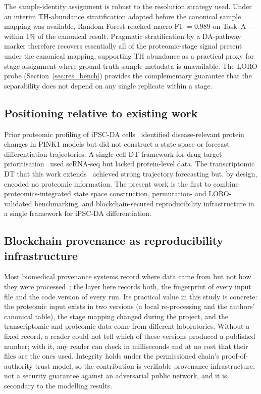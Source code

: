 \documentclass[5p,times,twocolumn]{elsarticle}
\newcommand{\rtag}[1]{}
\newenvironment{revblock}[1]{\par\rtag{#1}\ignorespaces}{\par}
\newcommand{\lang}[1]{#1}
\begin{document}
The sample-identity assignment is robust to the resolution
strategy used.
Under an interim TH-abundance stratification adopted before the
canonical \lang{sample} mapping was available, Random Forest reached
macro F1 $= 0.989$ on Task~A --- within 1\% of the canonical
result.
Pragmatic stratification by a DA-pathway marker therefore
recovers essentially all of the proteomic-stage signal present
under the canonical mapping, supporting TH abundance as a
\lang{practical} proxy for stage assignment where ground-truth sample
metadata is unavailable.
The LORO probe (Section~\ref{sec:res_bench}) provides the
complementary guarantee that the separability does not depend on
any single replicate within a stage.

\subsection{\textbf{Positioning relative to existing work}}

Prior proteomic profiling of iPSC-DA
cells~\cite{novak2022single} identified disease-relevant protein
changes in PINK1 models but did not construct a state space or
forecast differentiation trajectories.
A single-cell DT framework for drug-target
prioritisation~\cite{li2022dynamic} used scRNA-seq but lacked
protein-level data.
The transcriptomic DT that this work
extends~\cite{kanu2026transformer} achieved strong trajectory
forecasting but, by design, encoded no proteomic information.
The present work is the first to combine proteomics-integrated
state space construction, permutation- and LORO-validated
benchmarking, and blockchain-secured reproducibility
infrastructure in a single framework for iPSC-DA
differentiation.

\subsection{\textbf{Blockchain provenance as reproducibility
    infrastructure}}

\begin{revblock}{R1.14,R2.16}
  Most biomedical provenance systems record where data came from
  but not how they were processed~\cite{johns2023data}; the layer
  here records both, the fingerprint of every input file and the
  code version of every run. Its practical value in this study
  is concrete: the proteomic input exists in two versions (a local
  re-processing and the authors' canonical table), the stage
  mapping changed during the project, and the transcriptomic and
  proteomic data come from different laboratories. Without a
  fixed record, a reader could not tell which of these versions
  produced a published number; with it, any reader can check in
  milliseconds and at no cost that their files are the ones used.
  Integrity holds under the permissioned chain's
  proof-of-authority trust model, so the contribution is
  verifiable provenance infrastructure, not a security guarantee
  against an adversarial public network, and it is secondary to
  the modelling results.
\end{revblock}
\end{document}
